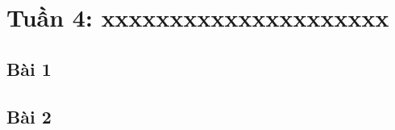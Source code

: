 \documentclass{article}
\begin{document}
\tableofcontents
\newpage
\listoffigures
\newpage
\section{Tuần 4: xxxxxxxxxxxxxxxxxxxxx}
\subsection{Bài 1}

 
\subsection{Bài 2}
  

\end{document}
